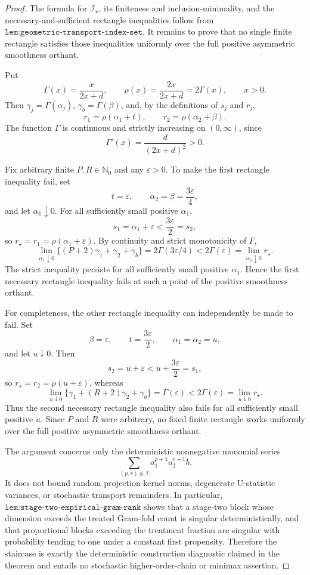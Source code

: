 \documentclass{article}
\begin{document}
\begin{proof}
The formula for \(\mathcal I_\star\), its finiteness and inclusion-minimality, and the necessary-and-sufficient rectangle inequalities follow from \(\texttt{lem:geometric-transport-index-set}\). It remains to prove that no single finite rectangle satisfies those inequalities uniformly over the full positive asymmetric smoothness orthant.

Put
\[
\Gamma(x)=\frac{x}{2x+d},
\qquad
\rho(x)=\frac{2x}{2x+d}=2\Gamma(x),
\qquad x>0.
\]
Then \(\gamma_j=\Gamma(\alpha_j)\), \(\gamma_b=\Gamma(\beta)\), and, by the definitions of \(s_j\) and \(r_j\),
\[
r_1=\rho(\alpha_1+t),
\qquad
r_2=\rho(\alpha_2+\beta).
\]
The function \(\Gamma\) is continuous and strictly increasing on \((0,\infty)\), since
\[
\Gamma'(x)=\frac{d}{(2x+d)^2}>0.
\]

Fix arbitrary finite \(P,R\in\mathbb N_0\) and any \(\varepsilon>0\). To make the first rectangle inequality fail, set
\[
t=\varepsilon,
\qquad
\alpha_2=\beta=\frac{3\varepsilon}{4},
\]
and let \(\alpha_1\downarrow0\). For all sufficiently small positive \(\alpha_1\),
\[
s_1=\alpha_1+\varepsilon<\frac{3\varepsilon}{2}=s_2,
\]
so \(r_\star=r_1=\rho(\alpha_1+\varepsilon)\). By continuity and strict monotonicity of \(\Gamma\),
\[
\lim_{\alpha_1\downarrow0}
\{(P+2)\gamma_1+\gamma_2+\gamma_b\}
=2\Gamma(3\varepsilon/4)
<2\Gamma(\varepsilon)
=\lim_{\alpha_1\downarrow0}r_\star.
\]
The strict inequality persists for all sufficiently small positive \(\alpha_1\). Hence the first necessary rectangle inequality fails at such a point of the positive smoothness orthant.

For completeness, the other rectangle inequality can independently be made to fail. Set
\[
\beta=\varepsilon,
\qquad
t=\frac{3\varepsilon}{2},
\qquad
\alpha_1=\alpha_2=u,
\]
and let \(u\downarrow0\). Then
\[
s_2=u+\varepsilon<u+\frac{3\varepsilon}{2}=s_1,
\]
so \(r_\star=r_2=\rho(u+\varepsilon)\), whereas
\[
\lim_{u\downarrow0}
\{\gamma_1+(R+2)\gamma_2+\gamma_b\}
=\Gamma(\varepsilon)
<2\Gamma(\varepsilon)
=\lim_{u\downarrow0}r_\star.
\]
Thus the second necessary rectangle inequality also fails for all sufficiently small positive \(u\). Since \(P\) and \(R\) were arbitrary, no fixed finite rectangle works uniformly over the full positive asymmetric smoothness orthant.

The argument concerns only the deterministic nonnegative monomial series
\[
\sum_{(p,r)\notin\mathcal I}a_1^{p+1}a_2^{r+1}b.
\]
It does not bound random projection-kernel norms, degenerate U-statistic variances, or stochastic transport remainders. In particular, \(\texttt{lem:stage-two-empirical-gram-rank}\) shows that a stage-two block whose dimension exceeds the treated Gram-fold count is singular deterministically, and that proportional blocks exceeding the treatment fraction are singular with probability tending to one under a constant first propensity. Therefore the staircase is exactly the deterministic construction diagnostic claimed in the theorem and entails no stochastic higher-order-chain or minimax assertion.
\end{proof}
\end{document}
